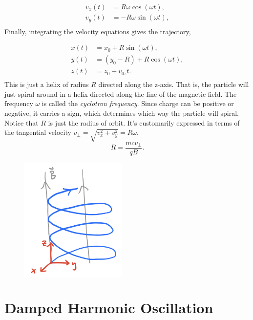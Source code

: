 \documentclass[
  letterpaper,
  DIV=11,
  numbers=noendperiod]{scrreprt}
\begin{document}
\[
\begin{align*}
v_x(t) &= R\omega \cos(\omega t) , \\
v_y(t) &= -R\omega \sin(\omega t)  , \\
\end{align*}
\] Finally, integrating the velocity equations gives the trajectory,

\[
\begin{align*}
x(t) &=  x_0 + R \sin(\omega t), \\
y(t) &= (y_0 - R) + R \cos(\omega t) , \\
z(t) &=  z_0 + v_{0z} t. \\
\end{align*}
\] This is just a helix of radius \(R\) directed along the z-axis. That
is, the particle will just spiral around in a helix directed along the
line of the magnetic field. The frequency \(\omega\) is called the
\emph{cyclotron frequency}. Since charge can be positive or negative, it
carries a sign, which determines which way the particle will spiral.
Notice that \(R\) is just the radius of orbit. It's customarily
expressed in terms of the tangential velocity
\(v_\perp = \sqrt{v_x^2 + v_y^2} = R\omega\), \[
R = \frac{mcv_\perp}{qB}.
\]

\begin{figure}

{\centering \includegraphics[width=2.08333in,height=\textheight]{classical-mechanics/./resources/image-20230215095809160.png}

}

\end{figure}

\hypertarget{damped-harmonic-oscillation}{%
\section{Damped Harmonic
Oscillation}\label{damped-harmonic-oscillation}}
\end{document}
